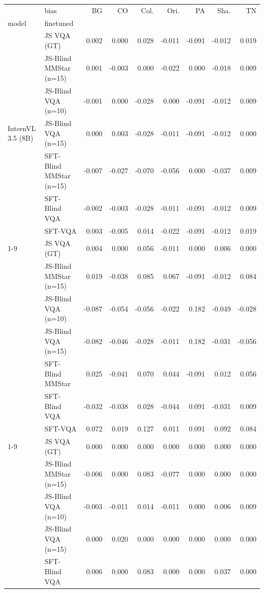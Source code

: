 \begin{tabular}{llrrrrrrr}
\toprule
 & bias & BG & CO & Col. & Ori. & PA & Sha. & TN \\
model & finetuned &  &  &  &  &  &  &  \\
\midrule
\multirow[t]{7}{*}{InternVL 3.5 (8B)} & JS VQA (GT) & 0.002 & 0.000 & 0.028 & -0.011 & -0.091 & -0.012 & 0.019 \\
 & JS-Blind MMStar (n=15) & 0.001 & -0.003 & 0.000 & -0.022 & 0.000 & -0.018 & 0.009 \\
 & JS-Blind VQA (n=10) & -0.001 & 0.000 & -0.028 & 0.000 & -0.091 & -0.012 & 0.009 \\
 & JS-Blind VQA (n=15) & 0.000 & 0.003 & -0.028 & -0.011 & -0.091 & -0.012 & 0.000 \\
 & SFT-Blind MMStar (n=15) & -0.007 & -0.027 & -0.070 & -0.056 & 0.000 & -0.037 & 0.009 \\
 & SFT-Blind VQA & -0.002 & -0.003 & -0.028 & -0.011 & -0.091 & -0.012 & 0.009 \\
 & SFT-VQA & 0.003 & -0.005 & 0.014 & -0.022 & -0.091 & -0.012 & 0.019 \\
\cline{1-9}
\multirow[t]{7}{*}{LLaVA‑Mistral (7B)} & JS VQA (GT) & 0.004 & 0.000 & 0.056 & -0.011 & 0.000 & 0.006 & 0.000 \\
 & JS-Blind MMStar (n=15) & 0.019 & -0.038 & 0.085 & 0.067 & -0.091 & -0.012 & 0.084 \\
 & JS-Blind VQA (n=10) & -0.087 & -0.054 & -0.056 & -0.022 & 0.182 & -0.049 & -0.028 \\
 & JS-Blind VQA (n=15) & -0.082 & -0.046 & -0.028 & -0.011 & 0.182 & -0.031 & -0.056 \\
 & SFT-Blind MMStar & 0.025 & -0.041 & 0.070 & 0.044 & -0.091 & 0.012 & 0.056 \\
 & SFT-Blind VQA & -0.032 & -0.038 & 0.028 & -0.044 & 0.091 & -0.031 & 0.009 \\
 & SFT-VQA & 0.072 & 0.019 & 0.127 & 0.011 & 0.091 & 0.092 & 0.084 \\
\cline{1-9}
\multirow[t]{6}{*}{Qwen3‑VL (4B)} & JS VQA (GT) & 0.000 & 0.000 & 0.000 & 0.000 & 0.000 & 0.000 & 0.000 \\
 & JS-Blind MMStar (n=15) & -0.006 & 0.000 & 0.083 & -0.077 & 0.000 & 0.000 & 0.000 \\
 & JS-Blind VQA (n=10) & -0.003 & -0.011 & 0.014 & -0.011 & 0.000 & 0.006 & 0.009 \\
 & JS-Blind VQA (n=15) & 0.000 & 0.020 & 0.000 & 0.000 & 0.000 & 0.000 & 0.000 \\
 & SFT-Blind VQA & 0.006 & 0.000 & 0.083 & 0.000 & 0.000 & 0.037 & 0.000 \\

\end{tabular}
